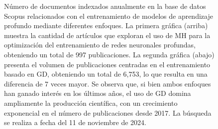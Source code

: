 \begin{figure}[!tbp]
  \centering
  \hfill
  \caption[Número de documentos indexados anualmente en la base de datos Scopus relacionados con el entrenamiento de modelos de aprendizaje profundo mediante diferentes enfoques]{Número de documentos indexados anualmente en la base de datos Scopus relacionados con el entrenamiento de modelos de aprendizaje profundo mediante diferentes enfoques. La primera gráfica (arriba) muestra la cantidad de artículos que exploran el uso de MH para la optimización del entrenamiento de redes neuronales profundas, obteniendo un total de 997 publicaciones. La segunda gráfica (abajo) presenta el volumen de publicaciones centradas en el entrenamiento basado en GD, obteniendo un total de 6,753, lo que resulta en una diferencia de 7 veces mayor. Se observa que, si bien ambos enfoques han ganado interés en los últimos años, el uso de GD domina ampliamente la producción científica, con un crecimiento exponencial en el número de publicaciones desde 2017. La búsqueda se realiza a fecha del 11 de noviembre de 2024.}
  \label{fig:resEdA}
\end{figure}

